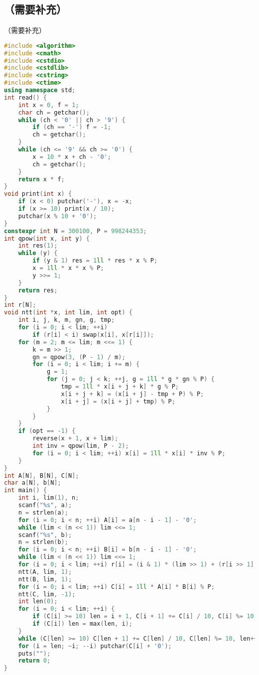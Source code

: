 \documentclass[9pt, a4paper, oneside]{book}
\begin{document}
\subsection{（需要补充）}
（需要补充）
\begin{lstlisting}[language={C++}]
#include <algorithm>
#include <cmath>
#include <cstdio>
#include <cstdlib>
#include <cstring>
#include <ctime>
using namespace std;
int read() {
    int x = 0, f = 1;
    char ch = getchar();
    while (ch < '0' || ch > '9') {
        if (ch == '-') f = -1;
        ch = getchar();
    }
    while (ch <= '9' && ch >= '0') {
        x = 10 * x + ch - '0';
        ch = getchar();
    }
    return x * f;
}
void print(int x) {
    if (x < 0) putchar('-'), x = -x;
    if (x >= 10) print(x / 10);
    putchar(x % 10 + '0');
}
constexpr int N = 300100, P = 998244353;
int qpow(int x, int y) {
    int res(1);
    while (y) {
        if (y & 1) res = 1ll * res * x % P;
        x = 1ll * x * x % P;
        y >>= 1;
    }
    return res;
}
int r[N];
void ntt(int *x, int lim, int opt) {
    int i, j, k, m, gn, g, tmp;
    for (i = 0; i < lim; ++i)
        if (r[i] < i) swap(x[i], x[r[i]]);
    for (m = 2; m <= lim; m <<= 1) {
        k = m >> 1;
        gn = qpow(3, (P - 1) / m);
        for (i = 0; i < lim; i += m) {
            g = 1;
            for (j = 0; j < k; ++j, g = 1ll * g * gn % P) {
                tmp = 1ll * x[i + j + k] * g % P;
                x[i + j + k] = (x[i + j] - tmp + P) % P;
                x[i + j] = (x[i + j] + tmp) % P;
            }
        }
    }
    if (opt == -1) {
        reverse(x + 1, x + lim);
        int inv = qpow(lim, P - 2);
        for (i = 0; i < lim; ++i) x[i] = 1ll * x[i] * inv % P;
    }
}
int A[N], B[N], C[N];
char a[N], b[N];
int main() {
    int i, lim(1), n;
    scanf("%s", a);
    n = strlen(a);
    for (i = 0; i < n; ++i) A[i] = a[n - i - 1] - '0';
    while (lim < (n << 1)) lim <<= 1;
    scanf("%s", b);
    n = strlen(b);
    for (i = 0; i < n; ++i) B[i] = b[n - i - 1] - '0';
    while (lim < (n << 1)) lim <<= 1;
    for (i = 0; i < lim; ++i) r[i] = (i & 1) * (lim >> 1) + (r[i >> 1] >> 1);
    ntt(A, lim, 1);
    ntt(B, lim, 1);
    for (i = 0; i < lim; ++i) C[i] = 1ll * A[i] * B[i] % P;
    ntt(C, lim, -1);
    int len(0);
    for (i = 0; i < lim; ++i) {
        if (C[i] >= 10) len = i + 1, C[i + 1] += C[i] / 10, C[i] %= 10;
        if (C[i]) len = max(len, i);
    }
    while (C[len] >= 10) C[len + 1] += C[len] / 10, C[len] %= 10, len++;
    for (i = len; ~i; --i) putchar(C[i] + '0');
    puts("");
    return 0;
}\end{lstlisting}
\end{document}
